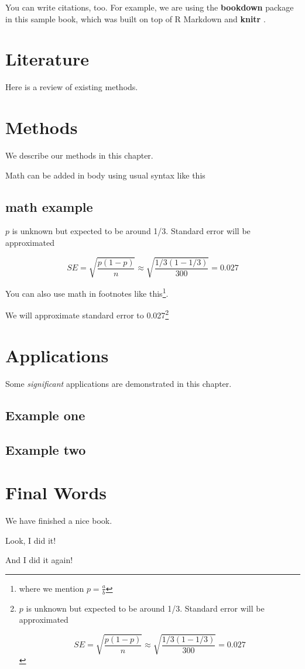 \documentclass[
]{book}
\begin{document}
You can write citations, too. For example, we are using the \textbf{bookdown} package \citep{R-bookdown} in this sample book, which was built on top of R Markdown and \textbf{knitr} \citep{xie2015}.

\chapter{Literature}\label{literature}

Here is a review of existing methods.

\chapter{Methods}\label{methods}

We describe our methods in this chapter.

Math can be added in body using usual syntax like this

\section{math example}\label{math-example}

\(p\) is unknown but expected to be around 1/3. Standard error will be approximated

\[
SE = \sqrt{\frac{p(1-p)}{n}} \approx \sqrt{\frac{1/3 (1 - 1/3)} {300}} = 0.027
\]

You can also use math in footnotes like this\footnote{where we mention \(p = \frac{a}{b}\)}.

We will approximate standard error to 0.027\footnote{\(p\) is unknown but expected to be around 1/3. Standard error will be approximated

  \[
  SE = \sqrt{\frac{p(1-p)}{n}} \approx \sqrt{\frac{1/3 (1 - 1/3)} {300}} = 0.027
  \]}

\chapter{Applications}\label{applications}

Some \emph{significant} applications are demonstrated in this chapter.

\section{Example one}\label{example-one}

\section{Example two}\label{example-two}

\chapter{Final Words}\label{final-words}

We have finished a nice book.

Look, I did it!

And I did it again!


\end{document}
